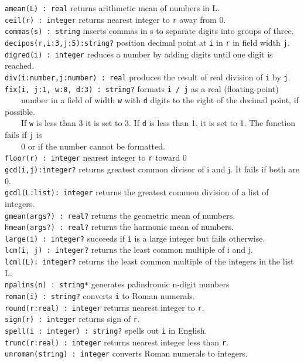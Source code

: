 \texttt{amean(L) : real} returns arithmetic mean of
numbers in L.\\
\texttt{ceil(r) : integer} returns nearest integer to
\texttt{r} away from 0.\\
\texttt{commas(s) : string} inserts commas in s to separate digits into
groups of three.\\
\texttt{decipos(r,i:3,j:5):string?} position decimal point at \texttt{i}
in \texttt{r} in field width \texttt{j}.\\
\texttt{digred(i) : integer} reduces a number by adding digits until one
digit is reached.\\
\texttt{div(i:number,j:number) : real} produces the result of real
division of \texttt{i} by \texttt{j}.\\
\texttt{fix(i, j:1, w:8, d:3) : string?} formats \texttt{i / j} as a
real (floating-point)\\
 \ \ \ \ number in a field of width \texttt{w} with \texttt{d} digits to
the right of the decimal point, if possible.\\
 \ \ \ \ If \texttt{w} is less than 3 it is set to 3. If \texttt{d} is
less than 1, it is set to 1. The function fails if \texttt{j}
is\\
 \ \ \ \ 0 or if the number cannot be formatted.\\
\texttt{floor(r)}\texttt{ : integer} nearest integer to
\texttt{r} toward 0\\
\texttt{gcd(i,j):integer?} returns greatest common divisor of i and j.
It fails if both are 0.\\
\texttt{gcdl(L:list): integer} returns the greatest common division of a
list of integers.\\
\texttt{gmean(args?) : real?} returns the geometric mean of
numbers.\\
\texttt{hmean(args?) : real?} returns the harmonic mean of
numbers.\\
\texttt{large(i) : integer?} succeeds if \texttt{i} is a large integer
but fails otherwise.\\
\texttt{lcm(i, j) : integer?} returns the least common multiple of i and
j.\\
\texttt{lcml(L): integer?} returns the least common multiple of the
integers in the list L.\\
\texttt{npalins(n) : string*} generates palindromic n-digit
numbers\\
\texttt{roman(i) : string?} converts \texttt{i} to Roman numerals.\\
\texttt{round(r:real) : integer} returns nearest integer to
\texttt{r}.\\
\texttt{sign(r) : integer} returns sign of \texttt{r}.\\
\texttt{spell(i : integer) : string?} spells out \texttt{i} in
English.\\
\texttt{trunc(r:real) : integer} returns nearest integer less than
\texttt{r}.\\
\texttt{unroman(string) : integer} converts Roman numerals to integers.

